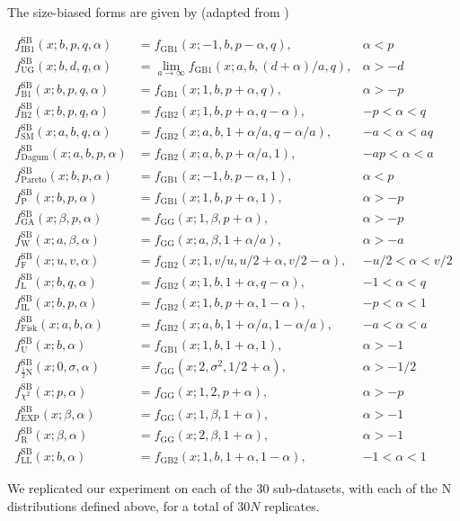 The size-biased forms are given by (adapted from \citealp{ducey2015sizebiased})

{\small
\begin{align}
f^{\text{SB}}_{\text{IB1}}(x; b, p, q, \alpha) &= f_{\text{GB1}}(x; -1, b, p - \alpha, q),&  \alpha < p \\
f^{\text{SB}}_{\text{UG}}(x; b, d, q, \alpha) &= \lim_{a \to \infty} f_{\text{GB1}}(x; a, b, (d + \alpha)/a, q),&  \alpha > -d \\
f^{\text{SB}}_{\text{B1}}(x; b, p, q, \alpha) &= f_{\text{GB1}}(x; 1, b, p + \alpha, q),&  \alpha > -p \\
f^{\text{SB}}_{\text{B2}}(x; b, p, q, \alpha) &= f_\text{{GB2}}(x; 1, b, p + \alpha, q- \alpha),&  -p < \alpha < q \\
f^{\text{SB}}_{\text{SM}}(x; a, b, q, \alpha) &= f_{\text{GB2}}(x; a, b, 1 + \alpha/a, q - \alpha/a),&  -a < \alpha < aq \\
f^{\text{SB}}_{\text{Dagum}}(x; a, b, p, \alpha) &= f_{\text{GB2}}(x; a, b, p + \alpha/a, 1),&  -ap < \alpha < a \\
f^{\text{SB}}_{\text{Pareto}}(x; b, p, \alpha) &= f_{\text{GB1}}(x; -1, b, p - \alpha, 1),&  \alpha < p \\
f^{\text{SB}}_{\text{P}}(x; b, p, \alpha) &= f_{\text{GB1}}(x; 1, b, p + \alpha, 1),&  \alpha > -p \\
f^{\text{SB}}_{\text{GA}}(x; \beta, p, \alpha) &= f_{\text{GG}}(x; 1, \beta, p + \alpha),&  \alpha > -p \\
f^{\text{SB}}_{\text{W}}(x; a, \beta, \alpha) &= f_{\text{GG}}(x; a, \beta, 1 + \alpha/a),&  \alpha > -a \\
f^{\text{SB}}_{\text{F}}(x; u, v, \alpha) &= f_{\text{GB2}}(x; 1, v/u, u/2 + \alpha, v/2 - \alpha),&  -u/2 < \alpha < v/2 \\
f^{\text{SB}}_{\text{L}}(x; b, q, \alpha) &= f_{\text{GB2}}(x; 1, b, 1 + \alpha, q - \alpha),&  -1 < \alpha < q \\
f^{\text{SB}}_{\text{IL}}(x; b, p, \alpha) &= f_{\text{GB2}}(x; 1, b, p + \alpha, 1 - \alpha),&  -p < \alpha < 1 \\
f^{\text{SB}}_{\text{Fisk}}(x; a, b, \alpha) &= f_{\text{GB2}}(x; a, b, 1 + \alpha/a, 1 - \alpha/a),&  -a < \alpha < a \\
f^{\text{SB}}_{\text{U}}(x; b, \alpha) &= f_{\text{GB1}}(x; 1, b, 1 + \alpha, 1),&  \alpha > -1 \\
f^{\text{SB}}_{\tfrac{1}{2}\text{N}}(x; 0, \sigma, \alpha) &= f_{\text{GG}}(x; 2, \sigma^2, 1/2 + \alpha),&  \alpha > -1/2 \\
f^{\text{SB}}_{\chi^2}(x; p, \alpha) &= f_{\text{GG}}(x; 1, 2, p + \alpha),&  \alpha > -p \\
f^{\text{SB}}_{\text{EXP}}(x; \beta, \alpha) &= f_{\text{GG}}(x; 1, \beta, 1 + \alpha),&  \alpha > -1 \\
f^{\text{SB}}_{\text{R}}(x; \beta, \alpha) &= f_{\text{GG}}(x; 2, \beta, 1 + \alpha),&  \alpha > -1 \\
f^{\text{SB}}_{\text{LL}}(x; b, \alpha) &= f_{\text{GB2}}(x; 1, b, 1 + \alpha, 1 - \alpha),&  -1 < \alpha < 1
\end{align}
}%

We replicated our experiment on each of the 30 sub-datasets, with each of the N distributions defined above, for a total of $30N$ replicates.
